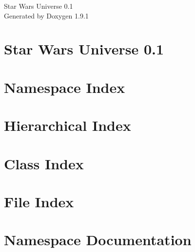 \let\mypdfximage\pdfximage\def\pdfximage{\immediate\mypdfximage}\documentclass[twoside]{book}
\newcommand{\+}{\discretionary{\mbox{\scriptsize$\hookleftarrow$}}{}{}}
\newcommand{\clearemptydoublepage}{%
  \newpage{\pagestyle{empty}\cleardoublepage}%
}
\begin{document}
\raggedbottom

\hypersetup{pageanchor=false,
             bookmarksnumbered=true,
             pdfencoding=unicode
            }
\begin{titlepage}
\vspace*{7cm}
\begin{center}%
{\Large Star Wars Universe 0.1 }\\
\vspace*{1cm}
{\large Generated by Doxygen 1.9.1}\\
\end{center}
\end{titlepage}
\clearemptydoublepage
{}
\tableofcontents
\clearemptydoublepage
{}
\hypersetup{pageanchor=true}

\chapter{Star Wars Universe 0.1}
\label{md__c___users__u_s_e_r_source_repos_bzareva_star_wars_universe_0_1__r_e_a_d_m_e}

\chapter{Namespace Index}

\chapter{Hierarchical Index}

\chapter{Class Index}

\chapter{File Index}

\chapter{Namespace Documentation}









\end{document}
